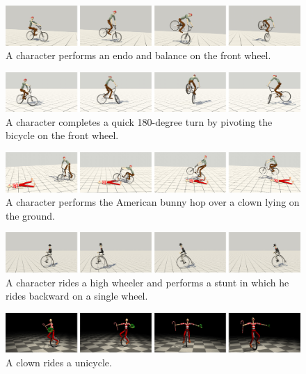 \begin{figure}[!t]
\centering
\includegraphics[width=\textwidth]{figures/endo}
\caption{A character performs an endo and balance on the front wheel.}
\label{fig:endo}
\end{figure}

\begin{figure}[ht]
\centering
\includegraphics[width=\textwidth]{figures/frontWheelPivot}
\caption{A character completes a quick 180-degree turn by pivoting the bicycle on the front wheel.}
\label{fig:pivot}
\end{figure}


\begin{figure}[ht]
\centering
\includegraphics[width=\textwidth]{figures/bunnyHop}
\caption{A character performs the American bunny hop over a clown lying on the ground.}
\label{fig:bunnyhop}
\end{figure}

\begin{figure}[ht]
\centering
\includegraphics[width=\textwidth]{figures/velocipede}
\caption{A character rides a high wheeler and performs a stunt in which he rides backward on a single wheel.}
\label{fig:highwheeler}
\end{figure}

\begin{figure}[ht]
\centering
\includegraphics[width=\textwidth]{figures/unicycle}
\caption{A clown rides a unicycle.}
\label{fig:unicycle}
\end{figure}

